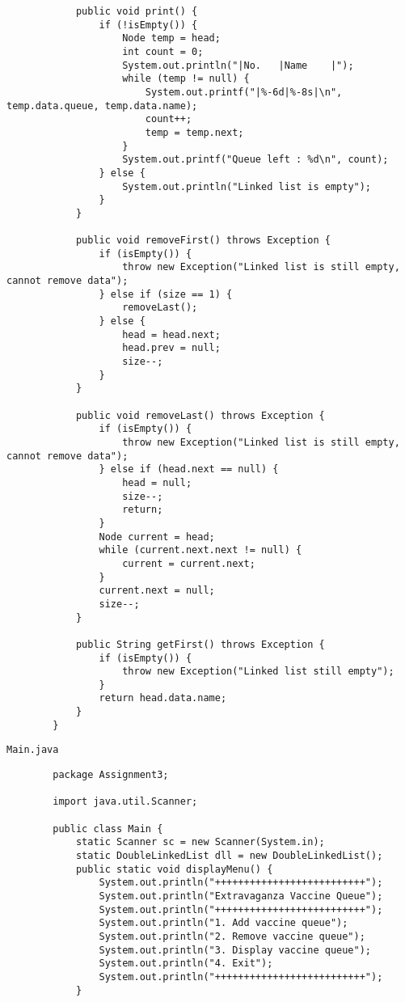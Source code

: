 \documentclass[12pt,titlepage]{article}
\begin{document}
\begin{enumerate}
\begin{verbatim}
            public void print() {
                if (!isEmpty()) {
                    Node temp = head;
                    int count = 0;
                    System.out.println("|No.   |Name    |");
                    while (temp != null) {
                        System.out.printf("|%-6d|%-8s|\n", temp.data.queue, temp.data.name);
                        count++;
                        temp = temp.next;
                    }
                    System.out.printf("Queue left : %d\n", count);
                } else {
                    System.out.println("Linked list is empty");
                }
            }

            public void removeFirst() throws Exception {
                if (isEmpty()) {
                    throw new Exception("Linked list is still empty, cannot remove data");
                } else if (size == 1) {
                    removeLast();
                } else {
                    head = head.next;
                    head.prev = null;
                    size--;
                }
            }

            public void removeLast() throws Exception {
                if (isEmpty()) {
                    throw new Exception("Linked list is still empty, cannot remove data");
                } else if (head.next == null) {
                    head = null;
                    size--;
                    return;
                } 
                Node current = head;
                while (current.next.next != null) {
                    current = current.next;
                }
                current.next = null;
                size--;
            }

            public String getFirst() throws Exception {
                if (isEmpty()) {
                    throw new Exception("Linked list still empty");
                }
                return head.data.name;
            }
        }

    \end{verbatim}
    \texttt{Main.java}
    \begin{verbatim}
        package Assignment3;

        import java.util.Scanner;

        public class Main {
            static Scanner sc = new Scanner(System.in);
            static DoubleLinkedList dll = new DoubleLinkedList();
            public static void displayMenu() {
                System.out.println("++++++++++++++++++++++++++");
                System.out.println("Extravaganza Vaccine Queue");
                System.out.println("++++++++++++++++++++++++++");
                System.out.println("1. Add vaccine queue");
                System.out.println("2. Remove vaccine queue");
                System.out.println("3. Display vaccine queue");
                System.out.println("4. Exit");
                System.out.println("++++++++++++++++++++++++++");
            }
            

\end{verbatim}
\end{enumerate}
\end{document}
